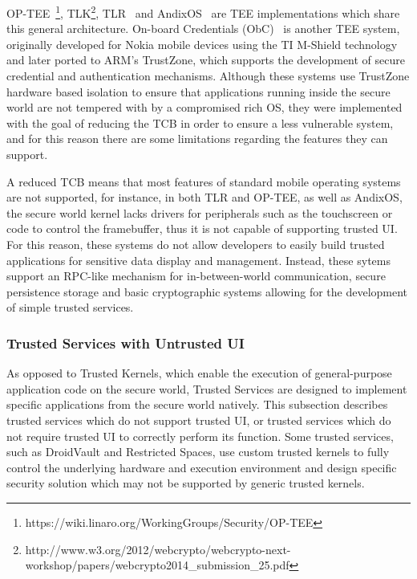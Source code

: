 OP-TEE~\footnote{https://wiki.linaro.org/WorkingGroups/Security/OP-TEE}, TLK\footnote{http://www.w3.org/2012/webcrypto/webcrypto-next-workshop/papers/webcrypto2014\_submission\_25.pdf}, TLR~\cite{santos2011trusted} and AndixOS~\cite{fitzekandix} are \ac{TEE} implementations which share this general architecture. On-board Credentials (ObC)~\cite{kostiainen2012board} is another \ac{TEE} system, originally developed for Nokia mobile devices using the TI M-Shield technology and later ported to ARM's TrustZone, which supports the development of secure credential and authentication mechanisms. Although these systems use TrustZone hardware based isolation to ensure that applications running inside the secure world are not tempered with by a compromised rich OS, they were implemented with the goal of reducing the \ac{TCB} in order to ensure a less vulnerable system, and for this reason there are some limitations regarding the features they can support.

A reduced \ac{TCB} means that most features of standard mobile operating systems are not supported, for instance, in both TLR and OP-TEE, as well as AndixOS, the secure world kernel lacks drivers for peripherals such as the touchscreen or code to control the framebuffer, thus it is not capable of supporting trusted UI. For this reason, these systems do not allow developers to easily build trusted applications for sensitive data display and management. Instead, these sytems support an RPC-like mechanism for in-between-world communication, secure persistence storage and basic cryptographic systems allowing for the development of simple trusted services.

\subsubsection{Trusted Services with Untrusted UI}

As opposed to Trusted Kernels, which enable the execution of general-purpose application code on the secure world, Trusted Services are designed to implement specific applications from the secure world natively. This subsection describes trusted services which do not support trusted UI, or trusted services which do not require trusted UI to correctly perform its function. Some trusted services, such as DroidVault and Restricted Spaces, use custom trusted kernels to fully control the underlying hardware and execution environment and design specific security solution which may not be supported by generic trusted kernels.

